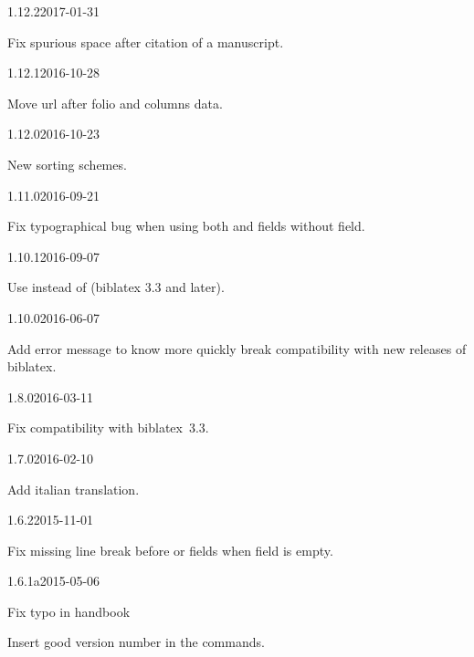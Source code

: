 \documentclass{ltxdockit}[2011/03/25]
\newcommand{\biblatex}{biblatex\xspace}
\begin{document}
\begin{changelog}

\begin{release}{1.12.2}{2017-01-31}
  \item Fix spurious space after citation of a manuscript.
\end{release}

\begin{release}{1.12.1}{2016-10-28}
  \item Move url after folio and columns data.
\end{release}

\begin{release}{1.12.0}{2016-10-23}
  \item New sorting schemes.
\end{release}

\begin{release}{1.11.0}{2016-09-21}
  \item Fix typographical bug when using both  and  fields without  field.
\end{release}

\begin{release}{1.10.1}{2016-09-07}
  \item Use  instead of  (biblatex 3.3 and later).
\end{release}

\begin{release}{1.10.0}{2016-06-07}
  \item Add error message to know more quickly break compatibility with new releases of biblatex.
\end{release}
\begin{release}{1.8.0}{2016-03-11}
	\item Fix compatibility with \biblatex~3.3.
\end{release}

\begin{release}{1.7.0}{2016-02-10}
	\item Add italian translation.
\end{release}

\begin{release}{1.6.2}{2015-11-01}
	\item Fix missing line break before  or  fields when  field is empty.
\end{release}

\begin{release}{1.6.1a}{2015-05-06}
	\item Fix typo in handbook
	\item Insert good version number in the  commands.
\end{release}


\end{changelog}
\end{document}
